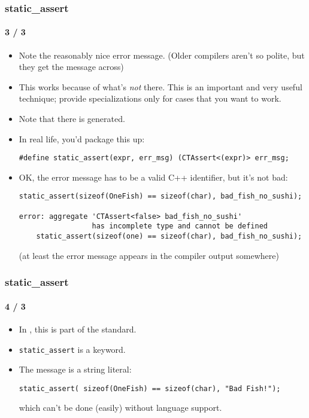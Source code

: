 \begin{frame}[fragile,t]
\frametitle{static\_assert}
\framesubtitle{3 / 3}

\begin{itemize}[<+->]
\item Note the reasonably nice error message.  (Older compilers aren't
  so polite, but they get the message across)
\item This works because of what's \emph{not} there.  This is an
  important and very useful technique; provide specializations only
  for cases that you want to work.
\item Note that there is  generated.
\item In real life, you'd package this up:
{\scriptsize\begin{verbatim}
#define static_assert(expr, err_msg) (CTAssert<(expr)> err_msg;
\end{verbatim}
}

\item OK, the error message has to be a valid C++ identifier, but it's
  not bad:

{\scriptsize\begin{verbatim}
static_assert(sizeof(OneFish) == sizeof(char), bad_fish_no_sushi);

error: aggregate 'CTAssert<false> bad_fish_no_sushi' 
                 has incomplete type and cannot be defined
    static_assert(sizeof(one) == sizeof(char), bad_fish_no_sushi);

\end{verbatim}
}

(at least the error message appears in the compiler output somewhere)
\end{itemize}

\end{frame}


\begin{frame}[fragile,t]
\frametitle{static\_assert}
\framesubtitle{4 / 3}
\begin{itemize}[<+->]
\item In , this is part of the standard.
\vskip 12pt
\item \texttt{static\_assert} is a keyword.
\vskip 12pt
\item The message is a string literal:
\vskip 12pt
{\scriptsize
\begin{verbatim}
static_assert( sizeof(OneFish) == sizeof(char), "Bad Fish!");
\end{verbatim}
}
which can't be done (easily) without language support.
\end{itemize}
\end{frame}


